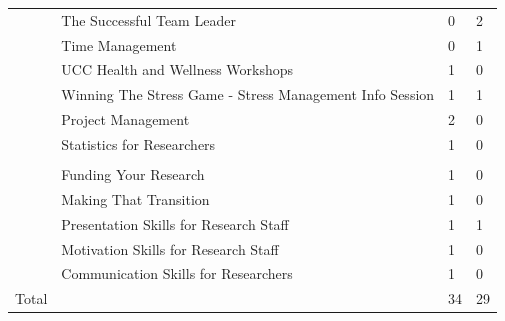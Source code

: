 \begin{mdframed}
\begin{longtable}{p{2cm}
                p{9.5cm}
                !{\qquad}
                R{1cm}
                R{1cm}}
    & The Successful Team Leader & 0 & 2 \\
    & Time Management & 0 & 1 \\
    & UCC Health and Wellness Workshops & 1 & 0 \\
    & Winning The Stress Game - Stress Management Info Session & 1 & 1 \\
    & Project Management & 2 & 0 \\
    & Statistics for Researchers & 1 & 0 \\
\pagebreak 
{}\\
\midrule 
    & Funding Your Research & 1 & 0 \\
    & Making That Transition & 1 & 0 \\
    & Presentation Skills for Research Staff & 1 & 1 \\
    & Motivation Skills for Research Staff & 1 & 0 \\
    & Communication Skills for Researchers & 1 & 0 \\
    \midrule 
    Total & & 34 & 29\\
    \bottomrule      
    
\end{longtable}
\end{mdframed}

\endgroup 